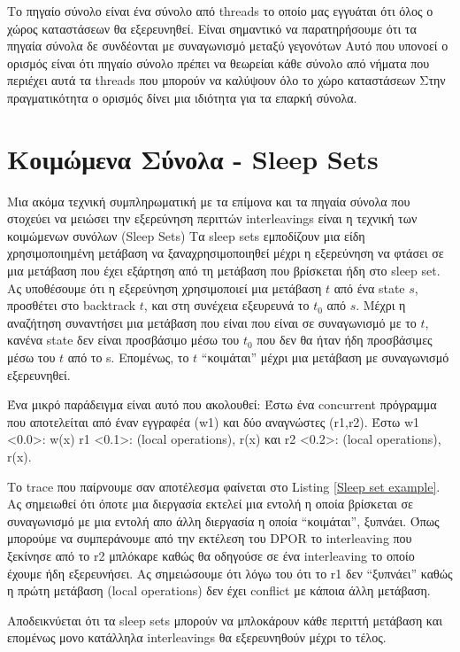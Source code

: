 Το πηγαίο σύνολο είναι ένα σύνολο από threads το οποίο μας εγγυάται ότι όλος ο χώρος καταστάσεων θα εξερευνηθεί.
Είναι σημαντικό να παρατηρήσουμε ότι τα πηγαία σύνολα δε συνδέονται με συναγωνισμό μεταξύ γεγονότων
Αυτό που υπονοεί ο ορισμός είναι ότι πηγαίο σύνολο πρέπει να θεωρείαι κάθε σύνολο από νήματα που περιέχει αυτά τα threads
που μπορούν να καλύψουν όλο το χώρο καταστάσεων
Στην πραγματικότητα ο ορισμός δίνει μια ιδιότητα για τα επαρκή σύνολα.

\section{Κοιμώμενα Σύνολα - Sleep Sets}

Μια ακόμα τεχνική συμπληρωματική με τα επίμονα και τα πηγαία σύνολα που στοχεύει να μειώσει την εξερεύνηση περιττών interleavings είναι η τεχνική των κοιμώμενων συνόλων (Sleep Sets)
Τα sleep sets εμποδίζουν μια είδη χρησιμοποιημένη μετάβαση να ξαναχρησιμοποιηθεί μέχρι η εξερεύνηση να φτάσει σε μια μετάβαση που έχει εξάρτηση από τη μετάβαση που βρίσκεται
ήδη στο sleep set.
Ας υποθέσουμε ότι η εξερεύνηση χρησιμοποιεί μια μετάβαση 
$t$ από ένα state $s$, προσθέτει στο backtrack $t$,
και στη συνέχεια εξευρευνά το  $t_0$ από $s$. Μέχρι η αναζήτηση συναντήσει μια μετάβαση που είναι που είναι σε συναγωνισμό με το 
$t$, κανένα state δεν είναι προσβάσιμο μέσω του
$t_0$ που δεν θα ήταν ήδη προσβάσιμες μέσω του $t$ από το s. Επομένως, το $t$
“κοιμάται” μέχρι μια μετάβαση με συναγωνισμό εξερευνηθεί.

Ένα μικρό παράδειγμα είναι αυτό που ακολουθεί:
Έστω ένα concurrent πρόγραμμα που αποτελείται από έναν εγγραφέα (w1) και δύο αναγνώστες (r1,r2).
Έστω w1 <0.0>: w(x) r1 <0.1>: (local operations), r(x) και r2 <0.2>: (local operations), r(x).

Το trace που παίρνουμε σαν αποτέλεσμα φαίνεται στο Listing \ref{Sleep set example}. Ας σημειωθεί ότι όποτε μια διεργασία εκτελεί μια εντολή
η οποία βρίσκεται σε συναγωνισμό με μια εντολή απο άλλη διεργασία η οποία ``κοιμάται'', ξυπνάει. 
Όπως μπορούμε να συμπεράνουμε από την εκτέλεση του DPOR το interleaving που ξεκίνησε από το r2 μπλόκαρε καθώς θα οδηγούσε σε ένα interleaving το οποίο έχουμε ήδη εξερευνήσει.
Ας σημειώσουμε ότι λόγω του ότι το r1 δεν ``ξυπνάει'' καθώς η πρώτη μετάβαση (local operations) δεν έχει conflict με κάποια άλλη μετάβαση.

Αποδεικνύεται \cite{Godefroid1996} ότι τα sleep sets μπορούν να μπλοκάρουν κάθε περιττή μετάβαση και επομένως μονο κατάλληλα interleavings θα εξερευνηθούν μέχρι το τέλος.


